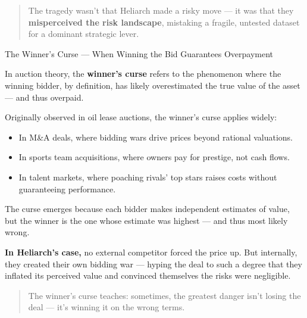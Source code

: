 \medskip

\begin{quote}
    The tragedy wasn’t that Heliarch made a risky move —  
    it was that they \textbf{misperceived the risk landscape}, mistaking a fragile, untested dataset for a dominant strategic lever.
\end{quote}

\medskip

\begin{HistoricalSidebar}{The Winner's Curse --- When Winning the Bid Guarantees Overpayment}

In auction theory, the \textbf{winner's curse} refers to the phenomenon where the winning bidder, by definition, has likely overestimated the true value of the asset — and thus overpaid.

\medskip

Originally observed in oil lease auctions, the winner’s curse applies widely:

\medskip

\begin{itemize}
    \item In M\&A deals, where bidding wars drive prices beyond rational valuations.
    \item In sports team acquisitions, where owners pay for prestige, not cash flows.
    \item In talent markets, where poaching rivals’ top stars raises costs without guaranteeing performance.
\end{itemize}

\medskip

The curse emerges because each bidder makes independent estimates of value, but the winner is the one whose estimate was highest — and thus most likely wrong.

\medskip

\textbf{In Heliarch’s case,} no external competitor forced the price up.  
But internally, they created their own bidding war — hyping the deal to such a degree that they inflated its perceived value and convinced themselves the risks were negligible.

\medskip

\begin{quote}
    The winner's curse teaches:  
    sometimes, the greatest danger isn’t losing the deal —  
    it’s winning it on the wrong terms.
\end{quote}

\end{HistoricalSidebar}

